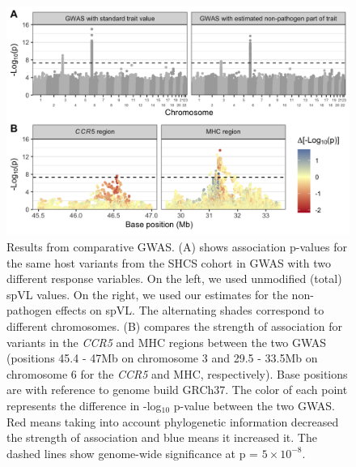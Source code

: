 \documentclass[11pt]{article}
\begin{document}
\begin{linenumbers}
\begin{figure}[H]
	\begin{center}
		\includegraphics[width=\linewidth]{figures/gwas_results}
		\caption{Results from comparative GWAS. (A) shows association p-values for the same host variants from the SHCS cohort in GWAS with two different response variables. On the left, we used unmodified (total) spVL values. On the right, we used our estimates for the non-pathogen effects on spVL. The alternating shades correspond to different chromosomes. (B) compares the strength of association for variants in the \emph{CCR5} and MHC regions between the two GWAS (positions 45.4 - 47Mb on chromosome 3 and 29.5 - 33.5Mb on chromosome 6 for the \emph{CCR5} and MHC, respectively). Base positions are with reference to genome build GRCh37. The color of each point represents the difference in -log$_{10}$ p-value between the two GWAS. Red means taking into account phylogenetic information decreased the strength of association and blue means it increased it. The dashed lines show genome-wide significance at p = $5 \times 10^{-8}$.}
		\label{fig:gwas-results}
	\end{center}
\end{figure}


\end{linenumbers}
\end{document}
